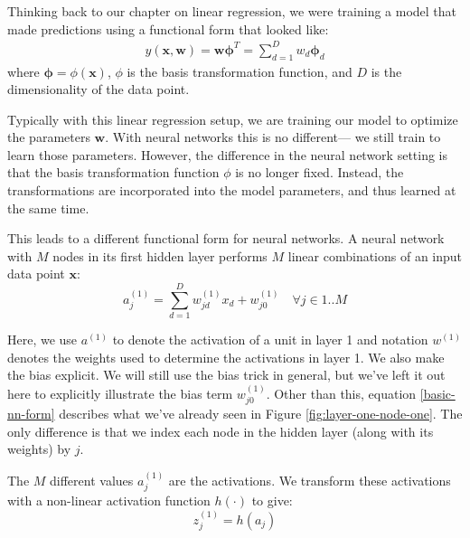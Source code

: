 Thinking back to our chapter on linear regression, we were training a model that made predictions using a functional form that looked like:
\begin{align*}
	y(\textbf{x}, \textbf{w}) = \textbf{w} \boldsymbol{\phi}^{T} = \sum_{d=1}^{D} w_{d} \boldsymbol{\phi}_{d}
\end{align*}
where $\boldsymbol{\phi} = \phi(\textbf{x})$, $\phi$ is the basis transformation function, and $D$ is the dimensionality of the data point.

Typically with this linear regression setup, we are training our model to optimize the parameters $\textbf{w}$. With neural networks this is no different--- we still train to learn those parameters. However, the difference in the neural network setting is that the basis transformation function $\phi$ is no longer fixed. Instead, the transformations are incorporated into the model parameters, and thus learned at the same time.

This leads to a different functional form for neural networks. A neural network with $M$ nodes in its first hidden layer  performs $M$ linear combinations of an input data point $\textbf{x}$:
\begin{equation} \label{basic-nn-form}
	a^{(1)}_{j} = \sum_{d=1}^{D} w_{jd}^{(1)} x_{d} + w_{j0}^{(1)} \quad \forall j \in 1..M
      \end{equation}

      Here, we use $a^{(1)}$ to denote the activation of a unit in layer 1 and notation $w^{(1)}$  denotes the weights used to determine the activations in layer 1. We also make the bias explicit.
      We will still use the bias trick in general, but we've left it out here to
      explicitly illustrate the bias term
      $w_{j0}^{(1)}$.
      Other than this,  equation \ref{basic-nn-form} describes what we've already seen in Figure \ref{fig:layer-one-node-one}. The only difference is that we index each node in the hidden layer (along with its weights) by $j$.

      
      The $M$ different values $a^{(1)}_{j}$ are the  activations. We transform these activations with a non-linear activation function $h(\cdot)$ to give:
\begin{equation} \label{basic-nn-z-outputs}
	z^{(1)}_{j} = h(a_{j})
      \end{equation}
      
